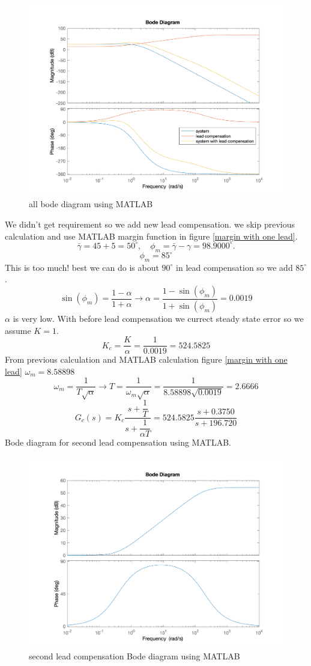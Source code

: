 \begin{figure}[H]
	\caption{all bode diagram using MATLAB}
	\centering
	\includegraphics[width=12cm]{../Figure/Q1/a/all_in_one.png}
\end{figure}
We didn't get requirement so we add new lead compensation.
we skip previous calculation and use MATLAB margin function in figure \ref{margin with one lead}.
$$
\bar{\gamma} = 45 + 5 = 50^{\circ},\quad \phi_m = \bar{\gamma} - \gamma = 98.9000^{\circ}.
$$
$$
\phi_m = 85^{\circ}
$$
This is too much!
best we can do is about $90^{\circ}$ in lead compensation so we add $85^{\circ}$.
$$
\sin(\phi_m) = \dfrac{1-\alpha}{1+\alpha} \to
\alpha = \dfrac{1-\sin(\phi_m) }{1+\sin(\phi_m) } = 0.0019
$$
$\alpha$ is very low.
With before lead compensation we currect steady state error so we assume $K = 1$.
$$
K_c = \dfrac{K}{\alpha} = \dfrac{1}{0.0019} = 524.5825
$$
From previous calculation and MATLAB calculation figure \ref{margin with one lead} $\omega_m = 8.58898$
$$
\omega_m = \dfrac{1}{T\sqrt{\alpha}} \to
T = \dfrac{1}{\omega_m\sqrt{\alpha}} = \dfrac{1}{8.58898\sqrt{0.0019}} = 2.6666
$$
$$
G_c(s) = K_c \dfrac{s + \dfrac{1}{T}}{s + \dfrac{1}{\alpha T}} = 524.5825\dfrac{s + 0.3750}{s + 196.720}
$$
Bode diagram for second lead compensation using MATLAB.
\begin{figure}[H]
	\caption{second lead compensation Bode diagram using MATLAB}
	\centering
	\includegraphics[width=12cm]{../Figure/Q1/a/new_controller_bode.png}
\end{figure}
